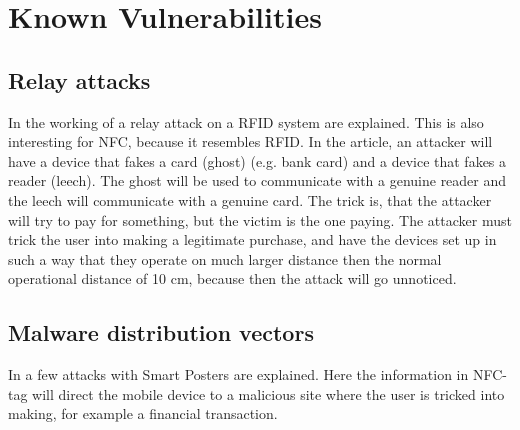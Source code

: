 \chapter{Known Vulnerabilities}
\label{chap:known_vulnerabilities}

\section{Relay attacks}

In \cite{1128470} the working of a relay attack on  a RFID system are explained.
This is also interesting for NFC, because it resembles RFID.
In the article, an attacker will have a device that fakes a card (ghost) (e.g. bank card) and a device that fakes a reader (leech). 
The ghost will be used to communicate with a genuine reader and the leech will communicate with a genuine card.
The trick is, that the attacker will try to pay for something, but the victim is the one paying.
The attacker must trick the user into making a legitimate purchase, and have the devices set up in such a way that they operate on much larger distance then the normal operational distance of 10 cm, because then the attack will go unnoticed.



\section{Malware distribution vectors}
In \cite{10.1109/ARES.2009.46} a few attacks with Smart Posters are explained.
Here the information in NFC-tag will direct the mobile device to a malicious site where the user is tricked into making, for example a financial transaction.



